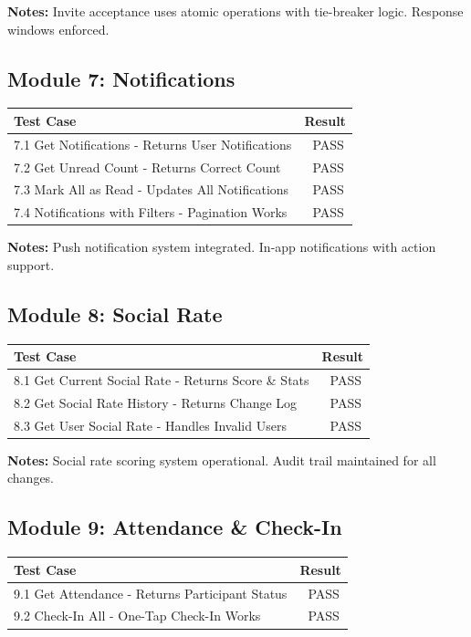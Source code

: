 \documentclass[11pt,a4paper]{article}
\newcommand{\pass}{\textcolor{pass}{\checkmark\ PASS}}
\begin{document}
\vspace{0.5cm}
\textbf{Notes:} Invite acceptance uses atomic operations with tie-breaker logic. Response windows enforced.


\subsection{Module 7: Notifications}

\begin{tabular}{|p{10cm}|c|}
\hline
\textbf{Test Case} & \textbf{Result} \\
\hline
7.1 Get Notifications - Returns User Notifications & \pass \\
\hline
7.2 Get Unread Count - Returns Correct Count & \pass \\
\hline
7.3 Mark All as Read - Updates All Notifications & \pass \\
\hline
7.4 Notifications with Filters - Pagination Works & \pass \\
\hline
\end{tabular}

\vspace{0.5cm}
\textbf{Notes:} Push notification system integrated. In-app notifications with action support.

\subsection{Module 8: Social Rate}

\begin{tabular}{|p{10cm}|c|}
\hline
\textbf{Test Case} & \textbf{Result} \\
\hline
8.1 Get Current Social Rate - Returns Score \& Stats & \pass \\
\hline
8.2 Get Social Rate History - Returns Change Log & \pass \\
\hline
8.3 Get User Social Rate - Handles Invalid Users & \pass \\
\hline
\end{tabular}

\vspace{0.5cm}
\textbf{Notes:} Social rate scoring system operational. Audit trail maintained for all changes.

\subsection{Module 9: Attendance \& Check-In}

\begin{tabular}{|p{10cm}|c|}
\hline
\textbf{Test Case} & \textbf{Result} \\
\hline
9.1 Get Attendance - Returns Participant Status & \pass \\
\hline
9.2 Check-In All - One-Tap Check-In Works & \pass \\
\hline
\end{tabular}
\end{document}

